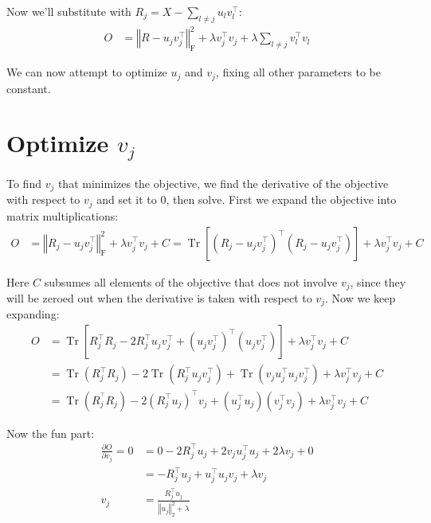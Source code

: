 \documentclass{article}
\DeclareMathOperator{\Tr}{Tr}
\begin{document}
Now we'll substitute with $R_j = X - \sum_{l\neq j} u_{l} v^{\top}_{l}$:
\begin{align}
O &= 
\left\Vert R -u_{j} v^{\top}_{j}  \right\Vert_\text{F}^2 
+\lambda v_j^\top v_j
+\lambda \sum_{l\neq j} v_l^\top v_l
\end{align}

We can now attempt to optimize $u_{j}$ and $v_{j}$, fixing all other parameters to be constant. 

\medskip
\section*{Optimize $v_{j}$}
To find $v_{j}$ that minimizes the objective, we find the derivative of the objective with respect to $v_{j}$ and set it to 0, then solve. First we expand the objective into matrix multiplications:
\begin{align}
O &= 
\left\Vert R_j -u_{j} v^{\top}_{j}  \right\Vert_\text{F}^2 
+\lambda v^\top_j v_j
+ C =
\Tr \left[
\left( R_j -u_{j} v^{\top}_{j} \right)^\top \left( R_j -u_{j} v^{\top}_{j} \right) \right]
+\lambda v^\top_j v_j
+ C
\end{align}

Here $C$ subsumes all elements of the objective that does not involve $v_j$, since they will be zeroed out when the derivative is taken with respect to $v_j$. Now we keep expanding:
\begin{align}
O &= 
\Tr \left[
R_j^\top R_j 
- 2R_j ^\top  u_j v_j^\top
+ \left( u_j v_j^\top \right)^\top \left( u_j v_j^\top \right) 
\right] 
+\lambda v^\top_j v_j
+ C \\
&= \Tr \left( R^\top_j R_j \right)
- 2 \Tr \left( R^\top_j u_{j} v^\top_{j} \right)
+  \Tr \left( v_{j}  u^{\top}_{j}   u_{j} v^{\top}_{j} \right)
+\lambda v^\top_j v_j
+ C \\
&= \Tr \left( R^{^\top}_j R_j \right)
- 2 \left( R^{\top}_j u_{j}  \right)^\top v_{j} 
+  \left( u^{\top}_{j}   u_{j} \right)\left( v^{\top}_{j} v_{j}  \right) 
+\lambda v^\top_j v_j
+ C \label{expanded} 
\end{align}

Now the fun part:
\begin{align}
\frac{\partial O}{\partial v_j} = 0 &=
0 - 2R^{\top}_j u_{j} + 2  v_{j} u^{\top}_{j} u_{j}
+ 2\lambda v_j
+ 0 \\
&= -R^{\top}_j u_{j} 
+ u^{\top}_{j} u_{j}  v_{j}
+ \lambda v_j
\\
v_{j} &= \frac{R^{\top}_j u_{j}}{\left\Vert u_{j} \right\Vert_2^2 + \lambda}
\end{align}
\end{document}
